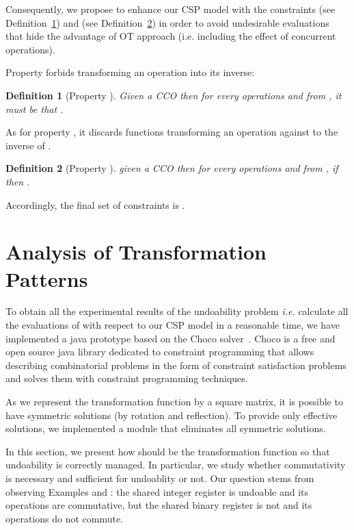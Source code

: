 \documentclass[submission,copyright,creativecommons]{eptcs}
\newtheorem{definition}{Definition}
\begin{document}
Consequently, we propose to enhance our CSP model with 
the  constraints  (see Definition~\ref{def:C1}) and  (see Definition~\ref{def:C2}) in order to avoid undesirable  evaluations that  hide the advantage of OT approach (i.e. including the effect of concurrent operations).

Property   forbids transforming an operation into its inverse:
\begin{definition}[Property ]\label{def:C1}
Given a CCO  then for every operations  and  from , it must be that .
\end{definition}

 As for property , it discards  functions transforming an operation  against  to the inverse of . 

\begin{definition}[Property ]\label{def:C2}
given a CCO  then for every operations  and  from , if  then .
\end{definition}


Accordingly, the final set of constraints is   . 





\section{Analysis of Transformation Patterns}

To obtain all the experimental results of the undoability problem \textit{i.e.} calculate all the evaluations of  with respect to our CSP model  
in a reasonable time, we have implemented a java prototype based on  the  Choco solver~\cite{choco}. Choco is a free and open source java library dedicated to constraint programming that allows describing combinatorial problems in the form of constraint satisfaction problems and solves them with constraint programming techniques. 

As we represent the transformation function by a square matrix, it is possible to have symmetric solutions (by rotation and reflection). To provide only effective solutions, we implemented a module that eliminates all symmetric solutions. 

In this section, we present how should be the transformation function so that undoability is correctly managed. 
In particular, we study whether commutativity is necessary and sufficient for undoablity or not. Our question stems from observing Examples  and : the shared integer register is undoable and its operations are commutative,
but the shared binary register is not   and its operations do not commute.
\end{document}
